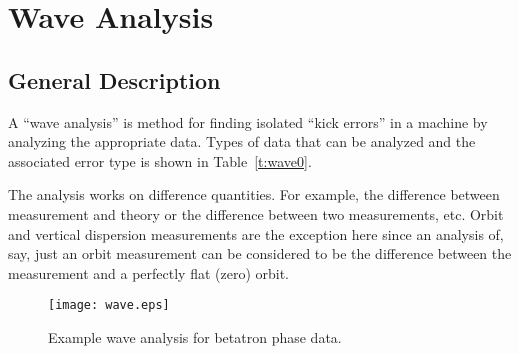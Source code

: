 \chapter{Wave Analysis}
\label{c:wave}


\section{General Description}
\label{s:wave.general}

A ``wave analysis'' is method for finding isolated ``kick errors'' in
a machine by analyzing the appropriate data. Types of data that can be
analyzed and the associated error type is shown in
Table~\ref{t:wave0}.  

The analysis works on difference quantities. For example, the
difference between measurement and theory or the difference between
two measurements, etc. Orbit and vertical dispersion measurements are the
exception here since an analysis of, say, just an orbit measurement can
be considered to be the difference between the measurement and a
perfectly flat (zero) orbit.

\begin{table}[h]
\caption[Wave measurement types.]
{Types of measurements that can be used in a wave analysis and the 
types of errors that can be diagnosed.}
\label{t:wave0}
\end{table}

\begin{figure}[t]
  \centering
  \texttt{[image: wave.eps]}
  \caption[Example wave analysis.]
{Example wave analysis for betatron phase data.}
  \label{f:wave}
\end{figure}

